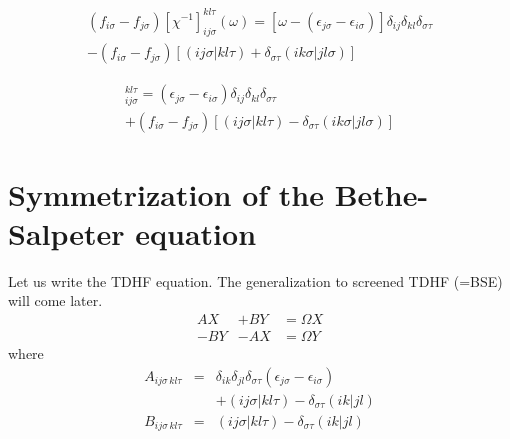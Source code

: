\documentclass[aps,prb,reprint,showpacs]{revtex4-1}
\begin{document}
\begin{multline}
( f_{i\sigma}  - f_{j\sigma} )  [\chi^{-1}]_{ij \sigma}^{kl \tau}(\omega) =
    [ \omega - ( \epsilon_{j\sigma} - \epsilon_{i\sigma} ) ] \delta_{ij} \delta_{kl} \delta_{\sigma\tau}  \\
    - ( f_{i\sigma}  - f_{j\sigma} ) [ ( ij \sigma | kl \tau ) + \delta_{\sigma\tau} ( ik \sigma | jl \sigma) ] 
\end{multline}


\begin{multline}
 [ H_\mathrm{BSE} ]_{ij \sigma}^{kl \tau} = 
      ( \epsilon_{j\sigma} - \epsilon_{i\sigma} ) \delta_{ij} \delta_{kl} \delta_{\sigma\tau}  \\
    + ( f_{i\sigma}  - f_{j\sigma} ) [ ( ij \sigma | kl \tau ) - \delta_{\sigma\tau} ( ik \sigma | jl \sigma) ] 
\end{multline}




\section{Symmetrization of the Bethe-Salpeter equation}


Let us write the TDHF equation.
The generalization to screened TDHF (=BSE) will come later.
\begin{subequations}
\begin{eqnarray}
 \label{eq:xy1}
 A X   & + B Y    &=    \Omega X \\
 \label{eq:xy2}
 -B Y  & -A X     &= \Omega Y
\end{eqnarray}
\end{subequations}
where
\begin{subequations}
\begin{eqnarray}
 A_{ij\sigma \, kl \tau} & = & \delta_{ik} \delta_{jl} \delta_{\sigma\tau} (\epsilon_{j\sigma} - \epsilon_{i\sigma}) \nonumber \\
                         &   & + ( i j \sigma | k l \tau ) - \delta_{\sigma\tau} ( i k | j l ) \\
 B_{ij\sigma \, kl \tau} & = & ( i j \sigma | k l \tau )  - \delta_{\sigma\tau} ( i k | j l ) 
\end{eqnarray}
\end{subequations}
\end{document}
